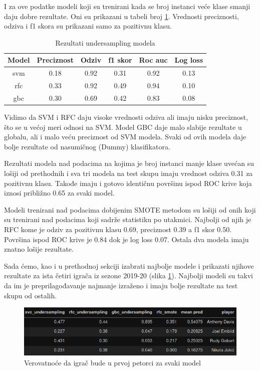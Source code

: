 \documentclass[a4paper]{article}
\begin{document}
I za ove podatke modeli koji su trenirani kada se broj instanci veće klase smanji daju dobre rezultate. Oni su prikazani u tabeli broj \ref{tab:undersampling_pp}. Vrednosti preciznosti, odziva i f1 skora su prikazani samo za pozitivnu klasu.

\begin{table}[!h]
\begin{center}
\begin{tabular}{|c|c|c|c|c|c|} \hline
\textbf{Model} & \textbf{Preciznost} & \textbf{Odziv} & \textbf{f1 skor} & \textbf{Roc auc} & \textbf{Log loss} \\ \hline
svm & 0.18 & 0.92 & 0.31 & 0.92 & 0.13 \\ \hline
rfc & 0.33 & 0.92 & 0.49 & 0.94 & 0.10 \\ \hline
gbc & 0.30 & 0.69 & 0.42 & 0.83 & 0.08 \\ \hline
\end{tabular}
\caption{Rezultati undersampling modela}
\label{tab:undersampling_pp}
\end{center}
\end{table}

Vidimo da SVM i RFC daju visoke vrednosti odziva ali imaju nisku preciznost, što se u većoj meri odnosi na SVM. Model GBC daje malo slabije rezultate u globalu, ali i malo veću preciznost od SVM modela. Svaki od ovih modela daje bolje rezultate od nasumičnog (Dummy) klasifikatora.

Rezultati modela nad podacima na kojima je broj instanci manje klase uvećan su lošiji od prethodnih i sva tri modela na test skupu imaju vrednost odziva 0.31 za pozitivnu klasu. Takođe imaju i gotovo identičnu površinu ispod ROC krive koja iznosi približno 0.65 za svaki model.

Modeli trenirani nad podacima dobijenim SMOTE metodom su lošiji od onih koji su trenirani nad podacima koji sadrže statistiku po utakmici. Najbolji od njih je RFC kome je odziv za pozitivnu klasu 0.69, preciznost 0.39 a f1 skor 0.50. Površina ispod ROC krive je 0.84 dok je log loss 0.07. Ostala dva modela imaju znatno lošije rezultate.

Sada ćemo, kao i u prethodnoj sekciji izabrati najbolje modele i prikazati njihove rezultate za ista četiri igrača iz sezone 2019-20 (slika \ref{plt:clf_pp}). Najbolji modeli su takvi da im je preprilagođavanje najmanje izraženo i imaju bolje rezultate na test skupu od ostalih.

\begin{figure}[h!]
\begin{center}
\includegraphics[scale=0.50]{clf_pp.png}
\end{center}
\caption{Verovatnoće da igrač bude u prvoj petorci za svaki model}
\label{plt:clf_pp}
\end{figure}
\end{document}
